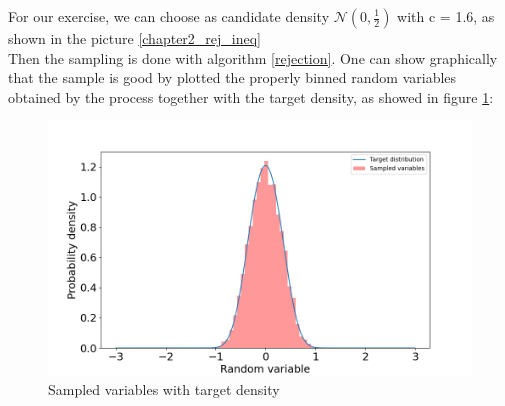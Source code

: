 For our exercise, we can choose as candidate density $\mathcal{N}(0,\frac{1}{2})$ with c = 1.6, as shown in the picture \ref{chapter2_rej_ineq} \\

Then the sampling is done with algorithm \ref{rejection}. 
One can show graphically that the sample is good by plotted the properly binned random variables obtained by the process together with the 
target density, as showed in figure \ref{chapter2_rej_variables}:

\begin{figure}[t!]
\centering
\includegraphics[width=1\textwidth]{FIG/exercise_2_images/rejection_sampling_verify.png}
\caption{Sampled variables with target density}
\label{chapter2_rej_variables}
\end{figure}
        